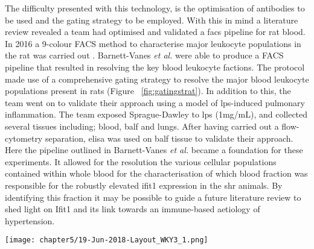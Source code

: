 The difficulty presented with this technology, is the optimisation of antibodies to be used and the gating strategy to be employed. With this in mind a literature review revealed a team had optimised and validated a \acrshort{facs} pipeline for rat blood. In 2016 a 9-colour FACS method to characterise major leukocyte populations in the rat was carried out \cite{Barnett-Vanes2016}. Barnett-Vanes \textit{et al.} were able to produce a FACS pipeline that resulted in resolving the key blood leukocyte factions. The protocol made use of a comprehensive gating strategy to resolve the major blood leukocyte populations present in rats (Figure ~\ref{fig:gatingstrat}). In addition to this, the team went on to validate their approach using a model of \acrfull{lps}-induced pulmonary inflammation. The team exposed Sprague-Dawley to \acrshort{lps} (1mg/mL), and collected several tissues including; blood, \acrfull{balf} and lungs. After having carried out a flow-cytometry separation, \acrfull{elisa} was used on \acrshort{balf} tissue to validate their approach. Here the pipeline outlined in Barnett-Vanes \textit{et al.} became a foundation for these experiments. It allowed for the resolution the various cellular populations contained within whole blood for the characterisation of which blood fraction was responsible for the robustly elevated \acrshort{ifit1} expression in the \acrshort{shr} animals. By identifying this fraction it may be possible to guide a future literature review to shed light on Ifit1 and its link towards an immune-based aetiology of hypertension.

\begin{sidewaysfigure}[!htbp]
\centering
\texttt{[image: chapter5/19-Jun-2018-Layout\_WKY3\_1.png]}
\caption[Representative gating strategy for 9-Colour FACS Analysis]{Representative gating strategy for 9-Colour FACS Analysis, as taken from Barnett-Vanes \textit{et al} \cite{Barnett-Vanes2016}. Initial gating compares levels of side-scatter (SSC) and forward-scatter (FSC) to identify cells from debris before singlet events are resolved by way of a low Trigger Pulse Width. Single cell events are then classified by viability, as detected by a low signal of the zombie staining method employed. Using the cell surface marker CD45, the leukocyte population can be isolated. The presence of the surface marker CD3 allows the resolution of total T-cells, which can then be separated by the detection of CD4 or CD8 in order to discern Cytotoxic T-cells from T-Helper Cells respectively. From the CD3- population, NK cells can be resolved by the presence of CD161. All remaining cells can be split into B-Cells and non B-cells by the presence of CD45R. A higher level of SSC is indicative of increased internal complexity (i.e. granularity) and allows for the non B-cells to be split into monocytes and neutrophils. Finally, the ratio of His48 and CD43 cell surface markers can be used to separate Classical from Non-classical monocytes.}
\label{fig:gatingstrat}
\end{sidewaysfigure}


